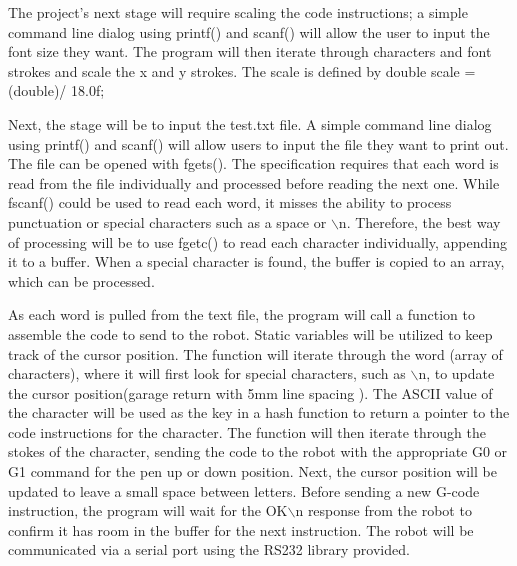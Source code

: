 The project's next stage will require scaling the code instructions; a simple command line dialog using printf() and scanf() will allow the user to input the font size they want. The program will then iterate through characters and font strokes and scale the x and y strokes. The scale is defined by double scale = (double)/ 18.0f; 

Next, the stage will be to input the test.txt file. A simple command line dialog using printf() and scanf() will allow users to input the file they want to print out. The file can be opened with fgets(). The specification requires that each word is read from the file individually and processed before reading the next one. While fscanf() could be used to read each word, it misses the ability to process punctuation or special characters such as a space or $\backslash$n. Therefore, the best way of processing will be to use fgetc() to read each character individually, appending it to a buffer. When a special character is found, the buffer is copied to an array, which can be processed. 

As each word is pulled from the text file, the program will call a function to assemble the code to send to the robot. Static variables will be utilized to keep track of the cursor position. The function will iterate through the word (array of characters), where it will first look for special characters, such as $\backslash$n, to update the cursor position(garage return with 5mm line spacing ). The ASCII value of the character will be used as the key in a hash function to return a pointer to the code instructions for the character. The function will then iterate through the stokes of the character, sending the code to the robot with the appropriate G0 or G1 command for the pen up or down position. Next, the cursor position will be updated to leave a small space between letters. Before sending a new G-code instruction, the program will wait for the OK$\backslash$n response from the robot to confirm it has room in the buffer for the next instruction. The robot will be communicated via a serial port using the RS232 library provided.

